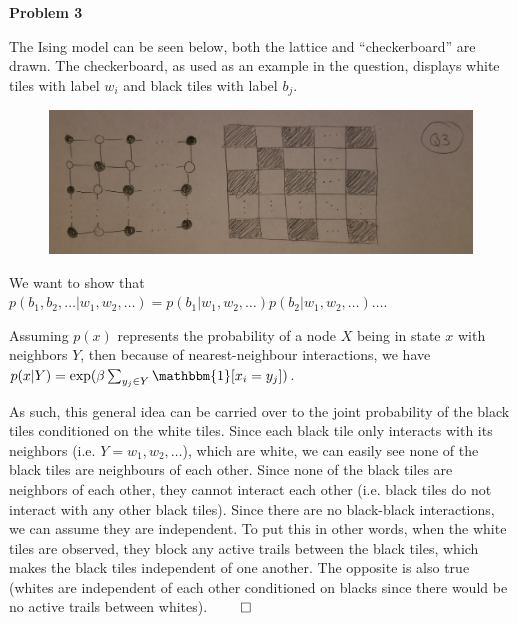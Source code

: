 \textbf{Problem 3}

The Ising model can be seen below, both the lattice and ``checkerboard'' are drawn. The checkerboard, as used as an example in the question, displays white tiles with label $w_i$ and black tiles with label $b_j$.

\begin{figure}[h]
	\centering
	\includegraphics[scale=0.1]{q3-diagrams}
\end{figure}

We want to show that $p(b_1, b_2, \dots \vert w_1, w_2, \dots) = p(b_1 \vert w_1, w_2, \dots)p(b_2 \vert w_1, w_2, \dots)\dots$.

Assuming $p(x)$ represents the probability of a node $X$ being in state $x$ with neighbors $Y$, then because of nearest-neighbour interactions, we have $p(x \vert Y) = \exp(\beta \sum_{y_j \in Y} \mathbbm{1}[x_i = y_j])$. 

As such, this general idea can be carried over to the joint probability of the black tiles conditioned on the white tiles. Since each black tile only interacts with its neighbors (i.e. $Y = {w_1, w_2, \dots}$), which are white, we can easily see none of the black tiles are neighbours of each other. Since none of the black tiles are neighbors of each other, they cannot interact each other (i.e. black tiles do not interact with any other black tiles). Since there are no black-black interactions, we can assume they are independent. To put this in other words, when the white tiles are observed, they block any active trails between the black tiles, which makes the black tiles independent of one another. The opposite is also true (whites are independent of each other conditioned on blacks since there would be no active trails between whites). $\qed$

